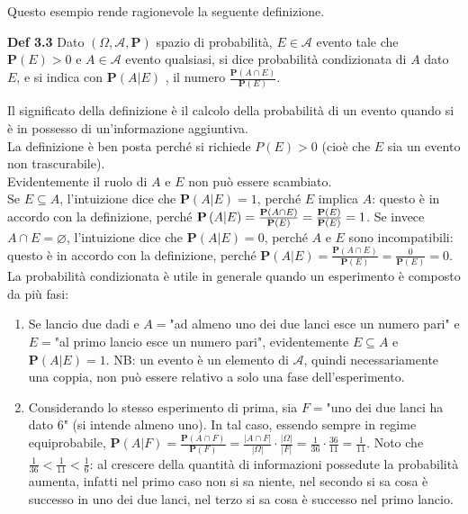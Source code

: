 \documentclass{article}
\begin{document}
Questo esempio rende ragionevole la seguente definizione.

\textbf{Def 3.3} Dato $\left( \Omega ,\mathcal{A},\mathbf{P}\right) $ spazio
di probabilit\`{a}, $E\in \mathcal{A}$ evento tale che $\mathbf{P}\left(
E\right) >0$ e $A\in \mathcal{A}$ evento qualsiasi, si dice probabilit\`{a}
condizionata di $A$ dato $E$, e si indica con $\mathbf{P}\left( A|E\right) $%
, il numero $\frac{\mathbf{P}\left( A\cap E\right) }{\mathbf{P}\left(
E\right) }$.

Il significato della definizione \`{e} il calcolo della probabilit\`{a} di
un evento quando si \`{e} in possesso di un'informazione aggiuntiva. \\
La
definizione \`{e} ben posta perch\'{e} si richiede \textbf{$P$}$\left(
E\right) >0$ (cio\`{e} che $E$ sia un evento non trascurabile). \\
Evidentemente il ruolo di $A$ e $E$ non pu\`{o} essere scambiato. \\
 Se $E\subseteq A$, l'intuizione dice che $%
\mathbf{P}\left( A|E\right) =1$, perch\'{e} $E$ implica $A$: questo \`{e} in
accordo con la definizione, perch\'{e} $\mathbf{P}\left( A|E\right) =\frac{%
\mathbf{P}\left( A\cap E\right) }{\mathbf{P}\left( E\right) }=\frac{\mathbf{P%
}\left( E\right) }{\mathbf{P}\left( E\right) }=1$. Se invece $A\cap
E=\varnothing $, l'intuizione dice che $\mathbf{P}\left( A|E\right) =0$,
perch\'{e} $A$ e $E$ sono incompatibili: questo \`{e} in accordo con la
definizione, perch\'{e} $\mathbf{P}\left( A|E\right) =\frac{\mathbf{P}\left(
A\cap E\right) }{\mathbf{P}\left( E\right) }=\frac{0}{\mathbf{P}\left(
E\right) }=0$.\\
La
probabilit\`{a} condizionata \`{e} utile in generale quando un esperimento 
\`{e} composto da pi\`{u} fasi:
\begin{enumerate}
\item Se lancio due dadi e $A=$"ad almeno uno dei due lanci esce un numero
pari" e $E=$"al primo lancio esce un numero pari", evidentemente $E\subseteq
A$ e $\mathbf{P}\left( A|E\right) =1$. NB: un evento \`{e} un elemento di $%
\mathcal{A}$, quindi necessariamente una coppia, non pu\`{o} essere relativo
a solo una fase dell'esperimento.

\item Considerando lo stesso esperimento di prima, sia $F=$"uno dei due
lanci ha dato $6$" (si intende almeno uno). In tal caso, essendo sempre in
regime equiprobabile, $\mathbf{P}\left( A|F\right) =\frac{\mathbf{P}\left(
A\cap F\right) }{\mathbf{P}\left( F\right) }=\frac{\left\vert A\cap
F\right\vert }{\left\vert \Omega \right\vert }\cdot \frac{\left\vert \Omega
\right\vert }{\left\vert F\right\vert }=\frac{1}{36}\cdot \frac{36}{11}=%
\frac{1}{11}$. Noto che $\frac{1}{36}<\frac{1}{11}<\frac{1}{6}$: al crescere
della quantit\`{a} di informazioni possedute la probabilit\`{a} aumenta,
infatti nel primo caso non si sa niente, nel secondo si sa cosa \`{e}
successo in uno dei due lanci, nel terzo si sa cosa \`{e} successo nel primo
lancio.
\end{enumerate}
\end{document}

